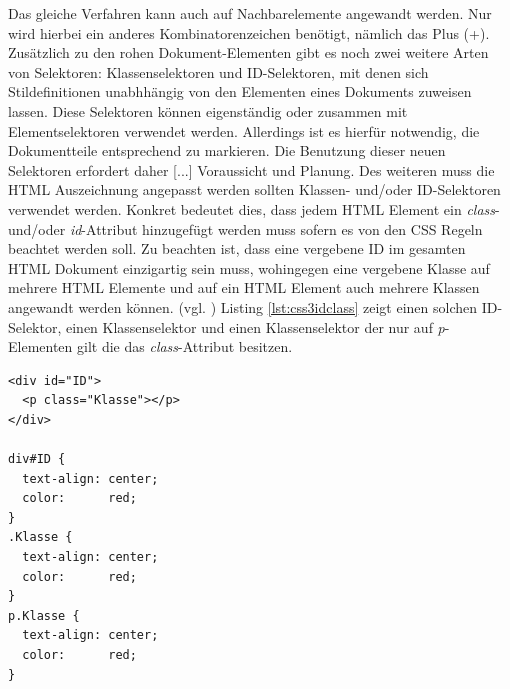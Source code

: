 Das gleiche Verfahren kann auch auf Nachbarelemente angewandt werden. Nur wird hierbei ein anderes Kombinatorenzeichen benötigt, nämlich das Plus (+).\\
\glqq Zusätzlich zu den rohen Dokument-Elementen gibt es noch zwei weitere Arten von Selektoren: Klassenselektoren und ID-Selektoren, mit denen sich Stildefinitionen unabhhängig von den Elementen eines Dokuments zuweisen lassen. Diese Selektoren können eigenständig oder zusammen mit Elementselektoren verwendet werden. Allerdings ist es hierfür notwendig, die Dokumentteile entsprechend zu markieren. Die Benutzung dieser neuen Selektoren erfordert daher [...] Voraussicht und Planung.\grqq{}\cite[S.34ff]{MeyeCasc2005} Des weiteren muss die HTML Auszeichnung angepasst werden sollten Klassen- und/oder ID-Selektoren verwendet werden. Konkret bedeutet dies, dass jedem HTML Element ein \textit{class}- und/oder \textit{id}-Attribut hinzugefügt werden muss sofern es von den CSS Regeln beachtet werden soll. Zu beachten ist, dass eine vergebene ID im gesamten HTML Dokument einzigartig sein muss, wohingegen eine vergebene Klasse auf mehrere HTML Elemente und auf ein HTML Element auch mehrere Klassen angewandt werden können. (vgl. \cite{W3ScCss2014}) Listing \ref{lst:css3idclass} zeigt einen solchen ID-Selektor, einen Klassenselektor und einen Klassenselektor der nur auf \textit{p}-Elementen gilt die das \textit{class}-Attribut besitzen.

	\vspace{1em}
	\begin{lstlisting}[frame=htrbl, caption=CSS3 Klassen- und ID-Selektoren, label=lst:css3idclass]
<div id="ID">
  <p class="Klasse"></p>
</div>

div#ID {
  text-align: center;
  color:      red;
}
.Klasse {
  text-align: center;
  color:      red;
}
p.Klasse {
  text-align: center;
  color:      red;
}
	\end{lstlisting}
	
